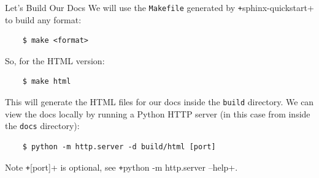 {
\begin{frame}[fragile]{Let's Build Our Docs}
  We will use the \texttt{Makefile} generated by \texttt+sphinx-quickstart+ to build any format:
  \begin{verbatim}
    $ make <format>
  \end{verbatim}
  So, for the HTML version:
  \begin{verbatim}
    $ make html
  \end{verbatim}
  This will generate the HTML files for our docs inside the \texttt{build} directory.
  We can view the docs locally by running a Python HTTP server (in this case from inside the \texttt{docs} directory):
  \begin{verbatim}
    $ python -m http.server -d build/html [port]
  \end{verbatim}

  \begin{block}{Note}
    \texttt+[port]+ is optional, see \texttt+python -m http.server --help+.
  \end{block}
\end{frame}
}
